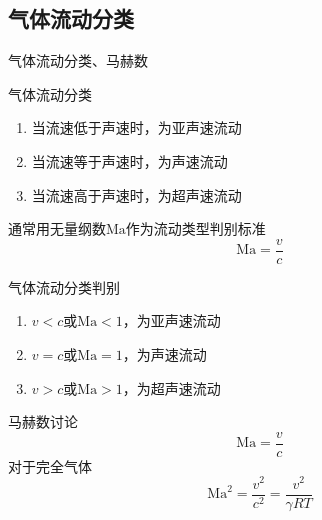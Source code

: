 \subsection{气体流动分类}
\begin{frame}{气体流动分类、马赫数}
 \begin{block}{气体流动分类}
   \begin{enumerate}
     \item 当流速低于声速时，为亚声速流动
     \item 当流速等于声速时，为声速流动
     \item 当流速高于声速时，为超声速流动
   \end{enumerate}
 \end{block} 
 通常用无量纲数$\mathrm{Ma}$作为流动类型判别标准
 \begin{equation*}
   \mathrm{Ma}
   =
   \frac{v}{c}
 \end{equation*}
 \vspace*{-1.5em}
 \begin{block}{气体流动分类判别}
   \begin{enumerate}
     \item $v<c$或$\mathrm{Ma}<1$，为亚声速流动
     \item $v=c$或$\mathrm{Ma}=1$，为声速流动
     \item $v>c$或$\mathrm{Ma}>1$，为超声速流动
   \end{enumerate}
 \end{block} 
\end{frame}

\begin{frame}{马赫数讨论}
  \begin{equation*}
    \mathrm{Ma}
    =
    \frac{v}{c}
  \end{equation*}
  对于完全气体
  \begin{equation*}
    \mathrm{Ma}^{2}
    =
    \frac{v^{2}}{c^{2}}
    =
    \frac{v^{2}}{\gamma RT}
  \end{equation*}
\end{frame}

